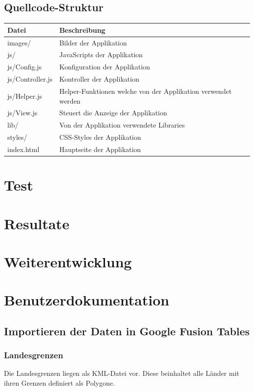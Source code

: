 \subsection{Quellcode-Struktur}
\begin{tabular}{|l|l|}
\hline 
Datei & Beschreibung \\ 
\hline 
images/ & Bilder der Applikation \\ 
\hline 
js/ & JavaScripts der Applikation \\ 
\hline 
js/Config.js & Konfiguration der Applikation \\ 
\hline 
js/Controller.js & Kontroller der Applikation \\ 
\hline 
js/Helper.js & Helper-Funktionen welche von der Applikation verwendet werden \\ 
\hline 
js/View.js & Steuert die Anzeige der Applikation \\ 
\hline 
lib/ & Von der Applikation verwendete Libraries \\ 
\hline 
styles/ & CSS-Styles der Applikation \\ 
\hline
index.html & Hauptseite der Applikation \\ 
\hline
\end{tabular} 


\section{Test}

\section{Resultate}

\section{Weiterentwicklung}

\section{Benutzerdokumentation}
\subsection{Importieren der Daten in Google Fusion Tables}
\subsubsection{Landesgrenzen}
Die Landesgrenzen liegen als KML-Datei vor. Diese beinhaltet alle Länder mit ihren Grenzen definiert als Polygone.

